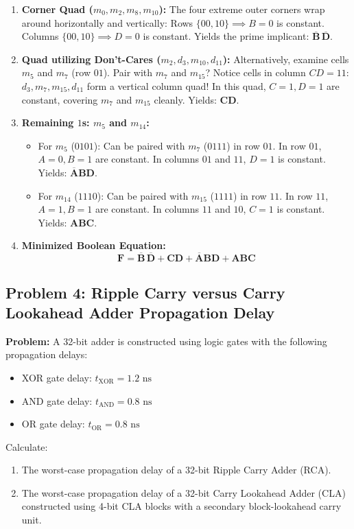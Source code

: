 \begin{enumerate}[label=\bfseries\arabic*.]
    \item \textbf{Corner Quad ($m_0, m_2, m_8, m_{10}$):}
    The four extreme outer corners wrap around horizontally and vertically:
    Rows $\{00, 10\} \implies B=0$ is constant. Columns $\{00, 10\} \implies D=0$ is constant.
    Yields the prime implicant: $\mathbf{\overline{B}\,\overline{D}}$.
    \item \textbf{Quad utilizing Don't-Cares ($m_2, d_3, m_{10}, d_{11}$):}
    Alternatively, examine cells $m_5$ and $m_7$ (row $01$). Pair with $m_7$ and $m_{15}$?
    Notice cells in column $CD=11$: $d_3, m_7, m_{15}, d_{11}$ form a vertical column quad!
    In this quad, $C=1, D=1$ are constant, covering $m_7$ and $m_{15}$ cleanly.
    Yields: $\mathbf{CD}$.
    \item \textbf{Remaining $1$s: $m_5$ and $m_{14}$:}
    \begin{itemize}
        \item For $m_5$ ($0101$): Can be paired with $m_7$ ($0111$) in row $01$.
        In row $01$, $A=0, B=1$ are constant. In columns $01$ and $11$, $D=1$ is constant.
        Yields: $\mathbf{\overline{A}BD}$.
        \item For $m_{14}$ ($1110$): Can be paired with $m_{15}$ ($1111$) in row $11$.
        In row $11$, $A=1, B=1$ are constant. In columns $11$ and $10$, $C=1$ is constant.
        Yields: $\mathbf{ABC}$.
    \end{itemize}
    \item \textbf{Minimized Boolean Equation:}
    \[ \mathbf{F = \overline{B}\,\overline{D} + CD + \overline{A}BD + ABC} \]
\end{enumerate}

\subsection{Problem 4: Ripple Carry versus Carry Lookahead Adder Propagation Delay}
\textbf{Problem:} A 32-bit adder is constructed using logic gates with the following propagation delays:
\begin{itemize}
    \item XOR gate delay: $t_{\text{XOR}} = 1.2\text{ ns}$
    \item AND gate delay: $t_{\text{AND}} = 0.8\text{ ns}$
    \item OR gate delay: $t_{\text{OR}} = 0.8\text{ ns}$
\end{itemize}
Calculate:
\begin{enumerate}[label=\bfseries\alph*.]
    \item The worst-case propagation delay of a 32-bit Ripple Carry Adder (RCA).
    \item The worst-case propagation delay of a 32-bit Carry Lookahead Adder (CLA) constructed using 4-bit CLA blocks with a secondary block-lookahead carry unit.
\end{enumerate}

